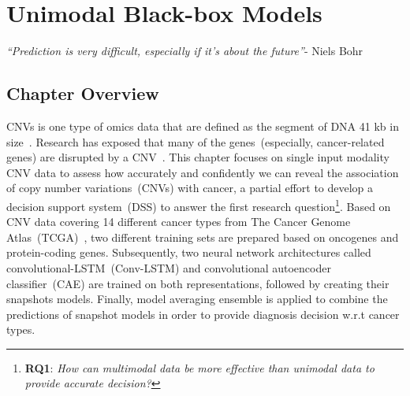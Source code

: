\chapter{Unimodal Black-box Models}\label{chapter:uni_modality}
\textit{``Prediction is very difficult, especially if it's about the future''}-
Niels Bohr

\section{Chapter Overview} 
CNVs is one type of omics data that are defined as the segment of DNA 41 kb in size~\cite{almal2012implications}. Research has exposed that many of the genes~(especially, cancer-related genes) are disrupted by a CNV~\cite{almal2012implications}. This chapter focuses on single input modality CNV data to assess how accurately and confidently we can reveal the association of copy number variations~(CNVs) with cancer, a partial effort to develop a decision support system~(DSS) to answer the first research question\footnote{\textbf{RQ1}: \textit{How can multimodal data be more effective than unimodal data to provide accurate decision?}}. Based on CNV data covering 14 different cancer types from The Cancer Genome Atlas~(TCGA)~\cite{tcga}, two different training sets are prepared based on oncogenes and protein-coding genes. Subsequently, two neural network architectures called convolutional-LSTM~({Conv-LSTM}) and convolutional autoencoder classifier~({CAE}) are trained on both representations, followed by creating their snapshots models. %
Finally, model averaging ensemble is applied to combine the predictions of snapshot models in order to provide diagnosis decision w.r.t cancer types. 

